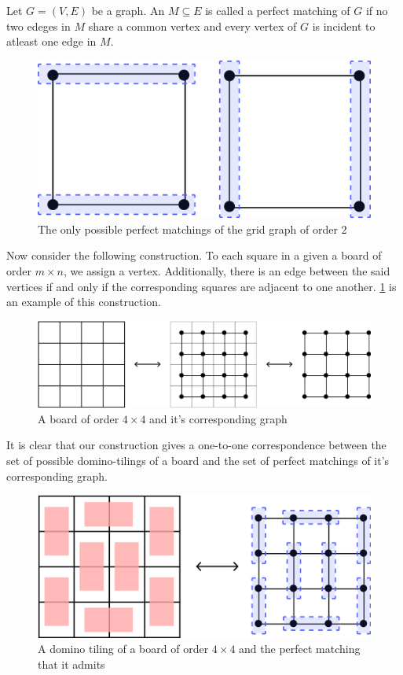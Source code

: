 \begin{definition}
Let $G=\left( V,E \right)$ be a graph. An $M\subseteq E$ is called a perfect matching of $G$ if no two edeges in $M$ share a common vertex and every vertex of $G$ is incident to atleast one edge in $M$.
\end{definition}
\begin{figure}[H]
	\centering
	\includegraphics[scale=0.6]{Images/Figure2.jpg}
	\caption{The only possible perfect matchings of the grid graph of order $2$}
\end{figure}
Now consider the following construction. To each square in a given a board of order $m\times n$, we assign a vertex. Additionally, there is an edge between the said vertices if and only if the corresponding squares are adjacent to one another. \cref{f:1.3} is an example of this construction. 
\begin{figure}[H]
	\centering
	\includegraphics[scale=0.6]{Images/Figure3.jpg}
	\caption{A board of order $4\times 4$ and it's corresponding graph}
	\label{f:1.3}
\end{figure}
It is clear that our construction gives a one-to-one correspondence between the set of possible domino-tilings of a board and the set of perfect matchings of it's corresponding graph.
\begin{figure}[H]
	\centering
	\includegraphics[scale=0.6]{Images/Figure4.png}
	\caption{A domino tiling of a board of order $4\times 4$ and the perfect matching that it admits}
\end{figure}
